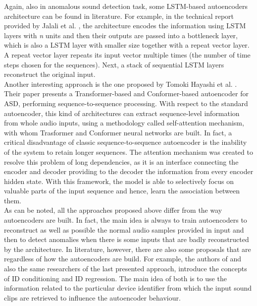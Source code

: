 Again, also in anomalous sound detection task, some LSTM-based autoencoders architecture can be found in literature. For example, in the technical report provided by Jalali et al. \cite{16LSTMDeepAutoencodersForASDtask}, the architecture encodes the information using LSTM layers with \textit{n} units and then their outputs are passed into a bottleneck layer, which is also a LSTM layer with smaller size together with a repeat vector layer. A repeat vector layer repeats its input vector multiple times (the number of time steps chosen for the sequences). Next, a stack of sequential LSTM layers reconstruct the original input.\\
Another interesting approach is the one proposed by Tomoki Hayashi et al. \cite{17ConformerBasedIDAWAREAutoencoder}. Their paper presents a Transformer-based and Conformer-based autoencoder for ASD, performing sequence-to-sequence processing. With respect to the standard autoencoder, this kind of architectures can extract sequence-level information from whole audio inputs, using a methodology called self-attention mechanism, with whom Trasformer and Conformer neural networks are built. In fact, a critical disadvantage of classic sequence-to-sequence autoencoder is the inability of the system to retain longer sequences. The attention mechanism was created to resolve this problem of long dependencies, as it is an interface connecting the encoder and decoder providing to the decoder the information from every encoder hidden state. With this framework, the model is able to selectively focus on valuable parts of the input sequence and hence, learn the association between them.\\
As can be noted, all the approaches proposed above differ from the way autoencoders are built. In fact, the main idea is always to train autoencoders to reconstruct as well as possible the normal audio samples provided in input and then to detect anomalies when there is some inputs that are badly reconstructed by the architecture. In literature, however, there are also some proposals that are regardless of how the autoencoders are build. For example, the authors of \cite{18IDConditionedAutoEncoder}\cite{19DescriptionDiscussionDCASE2020} and also the same researchers of the last presented approach, introduce the concepts of ID conditioning and ID regression. The main idea of both is to use the information related to the particular device identifier from which the input sound clips are retrieved to influence the autoencoder behaviour. 